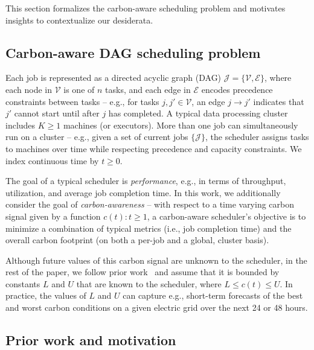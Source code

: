 This section formalizes the carbon-aware scheduling problem and motivates insights to contextualize 
our desiderata.

\vspace{-0.5em}
\subsection{Carbon-aware DAG scheduling problem}

Each job %
is represented as a directed acyclic graph (DAG) $\mathcal{J} = \{ \mathcal{V}, \mathcal{E} \}$, where each node in $\mathcal{V}$ is one of $n$ tasks, and each edge in $\mathcal{E}$ encodes precedence constraints between tasks -- e.g., for tasks $j, j' \in \mathcal{V}$, an edge $j \to j'$ indicates that $j'$ cannot start until after $j$ has completed.
A typical data processing cluster includes $K \geq 1$ machines (or executors).  More than one job can simultaneously run on a cluster -- e.g., given a set of current jobs $\{ \mathcal{J} \}$, the scheduler assigns tasks to machines over time while respecting precedence and capacity constraints.  We index continuous time by $t \geq 0$.

The goal of a typical scheduler is \textit{performance}, e.g., in terms of throughput, utilization, and average job completion time.  In this work, we additionally consider the goal of \textit{carbon-awareness} -- with respect to a time varying carbon signal given by a function $c(t) : t \geq 1$, a carbon-aware scheduler's objective is to minimize a combination of typical metrics (i.e., job completion time) and the overall carbon footprint (on both a per-job and a global, cluster basis).

Although future values of this carbon signal are unknown to the scheduler, in the rest of the paper, we follow prior work~\cite{Lechowicz:23, Bostandoost:24} and assume that it is bounded by constants $L$ and $U$ that are known to the scheduler, where $L \leq c(t) \leq U$.  In practice, the values of $L$ and $U$ can capture e.g., short-term forecasts of the best and worst carbon conditions on a given electric grid over the next 24 or 48 hours.




\vspace{-0.5em}
\subsection{Prior work and motivation}\label{sec:motiv}

